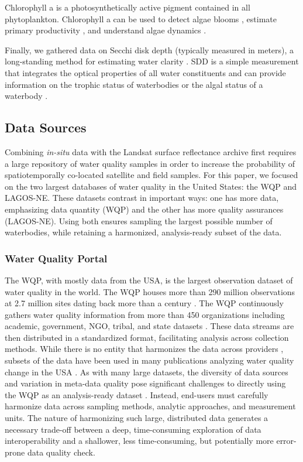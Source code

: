\documentclass[draft,linenumbers]{agujournal2018}
\begin{document}
Chlorophyll a is a photosynthetically active pigment contained in all
phytoplankton. Chlorophyll a can be used to detect algae blooms
\citep{Kutser2004}, estimate primary productivity \citep{Antoine1996},
and understand algae dynamics \citep{Richardson1996}.

Finally, we gathered data on Secchi disk depth (typically measured in
meters), a long-standing method for estimating water clarity
\citep{Secchi1864,Lee2018}. SDD is a simple measurement that integrates
the optical properties of all water constituents and can provide
information on the trophic status of waterbodies \citep{Carlson1977} or
the algal status of a waterbody \citep{Lorenzen1980}.

\subsection{Data Sources}

Combining \emph{in-situ} data with the Landsat surface reflectance
archive first requires a large repository of water quality samples in
order to increase the probability of spatiotemporally co-located
satellite and field samples. For this paper, we focused on the two
largest databases of water quality in the United States: the WQP and
LAGOS-NE. These datasets contrast in important ways: one has more data,
emphasizing data quantity (WQP) and the other has more quality
assurances (LAGOS-NE). Using both ensures sampling the largest possible
number of waterbodies, while retaining a harmonized, analysis-ready
subset of the data.

\subsubsection{Water Quality Portal}

The WQP, with mostly data from the USA, is the largest observation
dataset of water quality in the world. The WQP houses more than 290
million observations at 2.7 million sites dating back more than a
century \citep{Read2017}. The WQP continuously gathers water quality
information from more than 450 organizations including academic,
government, NGO, tribal, and state datasets \citep{Read2017}. These data
streams are then distributed in a standardized format, facilitating
analysis across collection methods. While there is no entity that
harmonizes the data across providers \citep{Read2017}, subsets of the
data have been used in many publications analyzing water quality change
in the USA \citep{Booth2011,Sprague2009,Oelsner2017}. As with many large
datasets, the diversity of data sources and variation in meta-data
quality pose significant challenges to directly using the WQP as an
analysis-ready dataset \citep{Sprague2017}. Instead, end-users must
carefully harmonize data across sampling methods, analytic approaches,
and measurement units. The nature of harmonizing such large, distributed
data generates a necessary trade-off between a deep, time-consuming
exploration of data interoperability and a shallower, less
time-consuming, but potentially more error-prone data quality check.
\end{document}
